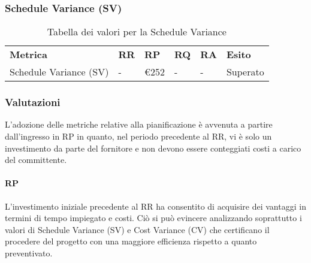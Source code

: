 \newpage
\subsubsection{Schedule Variance (SV)}
\renewcommand{\arraystretch}{2.2}
\begin{longtable}{|C{4.5cm}|C{1.5cm}|C{1.5cm}|C{1.5cm}|C{1.5cm}|C{1.5cm}|}

	\caption{Tabella dei valori per la Schedule Variance}\\
	\hline

	\textbf{Metrica} & \textbf{RR}  & \textbf{RP} & \textbf{RQ} & \textbf{RA} & \textbf{Esito}
	\tabularnewline
	\endfirsthead

	Schedule Variance (SV) & -  & \euro252 & - & - & Superato
\end{longtable}
\begin{center}
\end{center}

\newpage
\subsubsection{Valutazioni}
L'adozione delle metriche relative alla pianificazione è avvenuta a partire dall'ingresso in RP in quanto, nel periodo precedente al RR, vi è solo un investimento da parte del fornitore e non devono essere conteggiati costi a carico del committente.

\paragraph{RP}
L'investimento iniziale precedente al RR ha consentito di acquisire dei vantaggi in termini di tempo impiegato e costi. Ciò si può evincere analizzando soprattutto i valori di Schedule Variance (SV) e Cost Variance (CV) che certificano il procedere del progetto con una maggiore efficienza rispetto a quanto preventivato.

